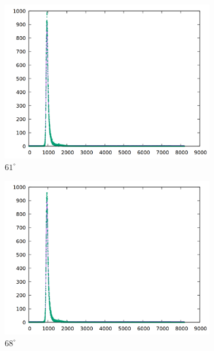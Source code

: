 \begin{figure}[h]
\begin{subfigure}[h]{0.49\textwidth}
    \includegraphics[width=\textwidth]{data/temp/na_61.png}
    \caption{$61^\circ$}
  \end{subfigure}
  \begin{subfigure}[h]{0.49\textwidth}
    \centering
    \includegraphics[width=\textwidth]{data/temp/na_68.png}
    \caption{$68^\circ$}
  \end{subfigure}
  \begin{subfigure}[h]{0.49\textwidth}
    \centering

\end{subfigure}
\end{figure}
